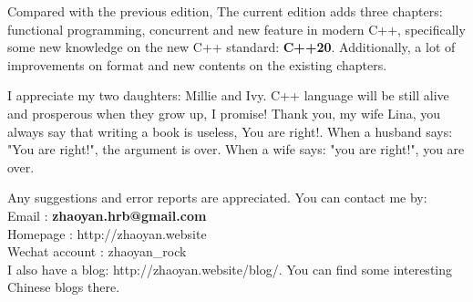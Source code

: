 \documentclass[a4paper,11pt,twoside]{book}
\begin{document}
\medskip

Compared with the previous edition, The current edition adds three chapters: functional programming, concurrent and new feature in modern C++,  specifically some new knowledge on the new C++ standard: \textbf{C++20}. Additionally, a lot of improvements on format and new contents on the existing chapters. \medskip  

I appreciate my two daughters: Millie and Ivy. C++ language will be still alive and prosperous when they grow up, I promise! Thank you, my wife Lina, you always say that writing a book is useless, You are right!. When a husband says: "You are right!", the argument is over. When a wife says: "you are right!", you are over. \par \par \medskip


Any suggestions and error reports are appreciated. You can contact me by: \\
Email          : \textbf{zhaoyan.hrb@gmail.com}  \\ 
Homepage       : http://zhaoyan.website  \\ 
Wechat account : zhaoyan\_rock   \\ 

I also have a blog: http://zhaoyan.website/blog/. You can find some interesting Chinese blogs there. 
\end{document}
